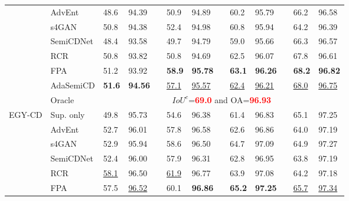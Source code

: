 \documentclass[lang=chs, degree=master, blindreview=false, adobe=false]{yanputhesis}
\begin{document}
\begin{table}[!htbp]
{\begin{tabular}{p{20mm}p{25mm}p{8mm}p{8mm}cp{8mm}p{8mm}cp{8mm}p{8mm}cp{8mm}p{8mm}}
      & AdvEnt\cite{vu2019advent}& 48.6 & 94.39 && 50.9 & 94.89 && 60.2 & 95.79 && 66.2 & 96.58 \\ %
      & s4GAN\cite{mittal2019semi}& 50.8 & 94.38 && 52.4 & 94.98 && 60.8 & 95.94 && 64.2 & 96.39 \\
      & SemiCDNet\cite{peng2021SemiCDNet} & 48.4 & 93.58 && 49.7 & 94.79 && 59.0 & 95.66 && 66.3 & 96.57 \\ %
      & RCR\cite{bandara2022RCR}& 50.8 & 93.82 && 50.8 & 94.69 && 62.5 & 96.07 && 67.8 & 96.61 \\
      \rowcolor{mycyan}
      \multirow{-7}{*}{\cellcolor{white}}& \cellcolor{white}
      FPA\cite{Zhang2023FPA}& \cellcolor{white}51.2 & \cellcolor{white}93.92 && \textbf{58.9} & \textbf{95.78} && \textbf{63.1} & \textbf{96.26} && \textbf{68.2} & \textbf{96.82} \\
      \multirow{-8}{*}{\cellcolor{white}}& \cellcolor{white}AdaSemiCD   &   \cellcolor{mycyan}\textbf{51.6} & \cellcolor{mycyan}\textbf{94.56} && \underline{57.1} & \underline{95.57} && \underline{62.4} & \underline{96.21} && \underline{68.0} & \underline{96.75} \\%
      \cline{2-13}
      & Oracle & \multicolumn{11}{c}{$ IoU^c$=\textcolor{red}{\bf 69.0} and OA=\textcolor{red}{\bf 96.93}} \\
      \bottomrule
      \multirow{8}{*}{EGY-CD}
      & Sup. only   &   49.8 & 95.73 && 54.6 & 96.38 && 61.4 & 96.83 && 65.1 & 97.25 \\ %
      & AdvEnt\cite{vu2019advent}& 52.7 & 96.01 && 57.8 & 96.58 && 62.6 & 96.86 && 64.0 & 97.19 \\ %
      & s4GAN\cite{mittal2019semi}& 52.9 & 95.94 && 58.6 & 96.50 && 64.7 & 97.09 && 64.9 & 97.27 \\
      & SemiCDNet\cite{peng2021SemiCDNet} & 52.4 & 96.00 && 57.9 & 96.31 && 62.8 & 96.95 && 63.8 & 97.19 \\ %
      & RCR\cite{bandara2022RCR}& \underline{58.1} & 96.50 && \underline{61.9} & 96.77 && 63.9 & 97.08 && 64.2 & 97.18 \\

      \multirow{-7}{*}{\cellcolor{white}}& \cellcolor{white}
      FPA\cite{Zhang2023FPA}& 57.5 & \underline{96.52} && 60.1 & \cellcolor{mycyan}\textbf{96.86} &\cellcolor{mycyan}& \cellcolor{mycyan}\textbf{65.2} & \cellcolor{mycyan}\textbf{97.25} && \underline{65.7} & \underline{97.34} \\


\end{tabular}}
\end{table}
\end{document}
